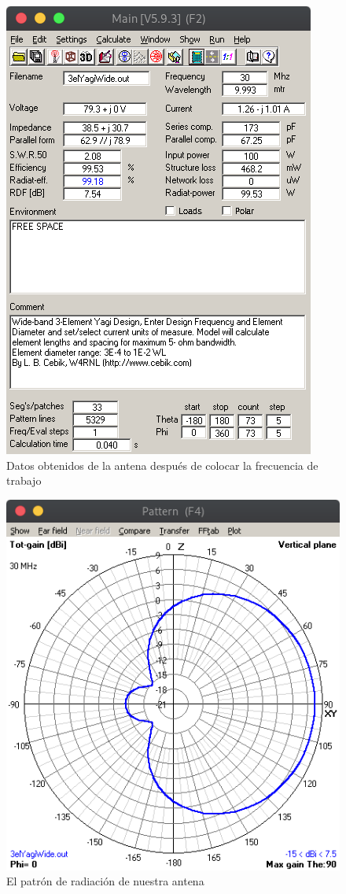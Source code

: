 \documentclass[11pt,a4paper]{article}
\begin{document}
\begin{figure}[H]
    \centering
    \includegraphics[scale=0.4]{images/Ejemplos/main1.png}
    \caption{Datos obtenidos de la antena después de colocar la frecuencia de trabajo}
    \label{fig3:yagui2d}
\end{figure}

\begin{figure}[H]
    \centering
    \includegraphics[scale=0.4]{images/Ejemplos/patern.png}
    \caption{El patrón de radiación de nuestra antena}
    \label{fig3:yagui2d}
\end{figure}
\end{document}
